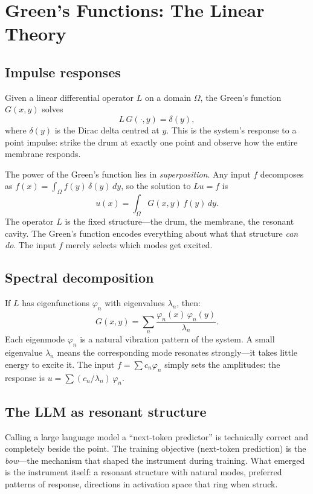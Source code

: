 \documentclass[11pt,a4paper]{article}
\begin{document}
\section{Green's Functions: The Linear Theory}

\subsection{Impulse responses}

Given a linear differential operator $L$ on a domain $\Omega$, the Green's
function $G(x,y)$ solves
\[
  L\, G(\cdot, y) = \delta(y),
\]
where $\delta(y)$ is the Dirac delta centred at $y$. This is the system's
response to a point impulse: strike the drum at exactly one point and observe
how the entire membrane responds.

The power of the Green's function lies in \emph{superposition}. Any input $f$
decomposes as $f(x) = \int_\Omega f(y)\,\delta(y)\,dy$, so the solution to
$Lu = f$ is
\[
  u(x) = \int_\Omega G(x,y)\, f(y)\, dy.
\]
The operator $L$ is the fixed structure---the drum, the membrane, the resonant
cavity. The Green's function encodes everything about what that structure
\emph{can do}. The input $f$ merely selects which modes get excited.

\subsection{Spectral decomposition}

If $L$ has eigenfunctions $\varphi_n$ with eigenvalues $\lambda_n$, then:
\[
  G(x,y) = \sum_{n} \frac{\varphi_n(x)\,\varphi_n(y)}{\lambda_n}.
\]
Each eigenmode $\varphi_n$ is a natural vibration pattern of the system. A small
eigenvalue $\lambda_n$ means the corresponding mode resonates strongly---it takes
little energy to excite it. The input $f = \sum c_n \varphi_n$ simply sets the
amplitudes: the response is $u = \sum (c_n / \lambda_n)\,\varphi_n$.

\subsection{The LLM as resonant structure}

Calling a large language model a ``next-token predictor'' is technically correct
and completely beside the point. The training objective (next-token prediction)
is the \emph{bow}---the mechanism that shaped the instrument during training.
What emerged is the instrument itself: a resonant structure with natural modes,
preferred patterns of response, directions in activation space that ring when
struck.
\end{document}
